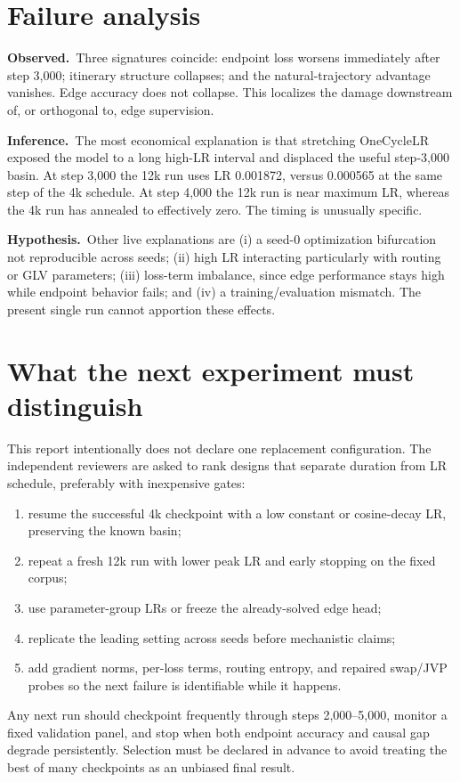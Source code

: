 \documentclass[10pt]{article}
\newcommand{\obs}{\textbf{Observed.}\ }
\newcommand{\inferr}{\textbf{Inference.}\ }
\newcommand{\hypo}{\textbf{Hypothesis.}\ }
\begin{document}
\section{Failure analysis}
\obs Three signatures coincide: endpoint loss worsens immediately after step
3,000; itinerary structure collapses; and the natural-trajectory advantage
vanishes. Edge accuracy does not collapse. This localizes the damage downstream
of, or orthogonal to, edge supervision.

\inferr The most economical explanation is that stretching OneCycleLR exposed
the model to a long high-LR interval and displaced the useful step-3,000 basin.
At step 3,000 the 12k run uses LR 0.001872, versus 0.000565 at the same step of
the 4k schedule. At step 4,000 the 12k run is near maximum LR, whereas the 4k
run has annealed to effectively zero. The timing is unusually specific.

\hypo Other live explanations are (i) a seed-0 optimization bifurcation not
reproducible across seeds; (ii) high LR interacting particularly with routing
or GLV parameters; (iii) loss-term imbalance, since edge performance stays
high while endpoint behavior fails; and (iv) a training/evaluation mismatch.
The present single run cannot apportion these effects.

\newpage
\section{What the next experiment must distinguish}
This report intentionally does not declare one replacement configuration. The
independent reviewers are asked to rank designs that separate duration from LR
schedule, preferably with inexpensive gates:
\begin{enumerate}
\item resume the successful 4k checkpoint with a low constant or cosine-decay
LR, preserving the known basin;
\item repeat a fresh 12k run with lower peak LR and early stopping on the fixed
corpus;
\item use parameter-group LRs or freeze the already-solved edge head;
\item replicate the leading setting across seeds before mechanistic claims;
\item add gradient norms, per-loss terms, routing entropy, and repaired
swap/JVP probes so the next failure is identifiable while it happens.
\end{enumerate}

Any next run should checkpoint frequently through steps 2,000--5,000, monitor a
fixed validation panel, and stop when both endpoint accuracy and causal gap
degrade persistently. Selection must be declared in advance to avoid treating
the best of many checkpoints as an unbiased final result.
\end{document}

